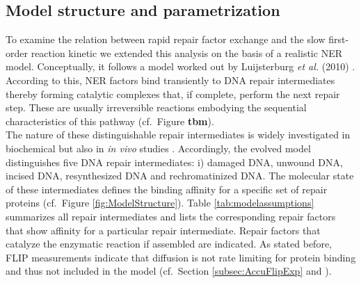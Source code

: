 \subsection{Model structure and parametrization}
To examine the relation between rapid repair factor exchange and the slow first-order reaction kinetic we extended this analysis on the basis of a realistic NER model. Conceptually, it follows a model worked out by Luijsterburg \textit{et al.} (2010) \cite{Luijsterburg2010}. According to this, NER factors bind transiently to DNA repair intermediates thereby forming catalytic complexes that, if complete, perform the next repair step. These are usually irreversible reactions embodying the sequential characteristics of this pathway (cf.\ Figure \textbf{tbm}).\\
The nature of these distinguishable repair intermediates is widely investigated in biochemical but also in \textit{in vivo} studies \cite{Evans1997a,Mu1996,Polo2006,Tapias2004}.
Accordingly, the evolved model distinguishes five DNA repair intermediates: i) damaged DNA, unwound DNA, incised DNA, resynthesized DNA and rechromatinized DNA. The molecular state of these intermediates defines the binding affinity for a specific set of repair proteins (cf.\ Figure \ref{fig:ModelStructure}). Table \ref{tab:modelassumptions} summarizes all repair intermediates and lists the corresponding repair factors that show affinity for a particular repair intermediate. Repair factors that catalyze the enzymatic reaction if assembled are indicated. As stated before, FLIP measurements indicate that diffusion is not rate limiting for protein binding and thus not included in the model (cf.\ Section \ref{subsec:AccuFlipExp} and \cite{Rademakers2003,Zotter2006}).              


